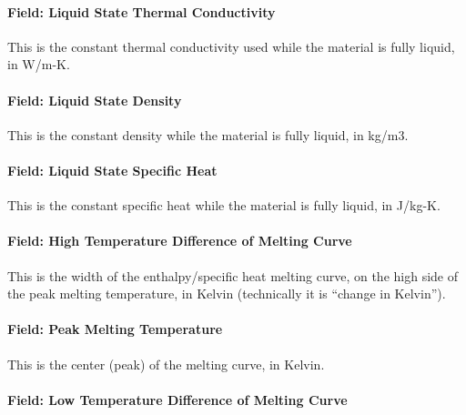 \paragraph{Field: Liquid State Thermal Conductivity}\label{materialpropertyphasechangehysteresis-inputs-liquidk}

This is the constant thermal conductivity used while the material is fully liquid, in W/m-K.

\paragraph{Field: Liquid State Density}\label{materialpropertyphasechangehysteresis-inputs-liquidrho}

This is the constant density while the material is fully liquid, in kg/m3.

\paragraph{Field: Liquid State Specific Heat}\label{materialpropertyphasechangehysteresis-inputs-liquid-state-specific-heat}

This is the constant specific heat while the material is fully liquid, in J/kg-K.

\paragraph{Field: High Temperature Difference of Melting Curve}\label{materialpropertyphasechangehysteresis-inputs-high-temperature-difference-of-melting-curve}

This is the width of the enthalpy/specific heat melting curve, on the high side of the peak melting temperature, in Kelvin (technically it is ``change in Kelvin'').

\paragraph{Field: Peak Melting Temperature}\label{materialpropertyphasechangehysteresis-inputs-peak-melting-temperature}

This is the center (peak) of the melting curve, in Kelvin.

\paragraph{Field: Low Temperature Difference of Melting Curve}\label{materialpropertyphasechangehysteresis-inputs-low-temperature-difference-of-melting-curve}

